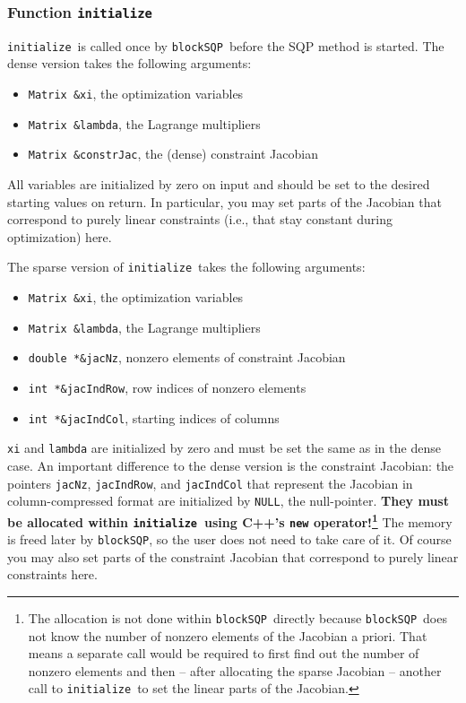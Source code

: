 \documentclass[	11pt,
				a4paper,
				abstract=true,
				twoside=true,
				bibliography=totoc, 
				headinclude=true,
				footinclude=false]{scrartcl}
\newcommand{\blockSQP}{\texttt{blockSQP}}
\newcommand{\init}{\texttt{initialize}}
\begin{document}
\subsubsection{Function \init}
\init\ is called once by \blockSQP\ before the SQP method is started. The dense version takes the following arguments:
\begin{itemize}
\item \texttt{Matrix \&xi}, the optimization variables
\item \texttt{Matrix \&lambda}, the Lagrange multipliers
\item \texttt{Matrix \&constrJac}, the (dense) constraint Jacobian
\end{itemize}
All variables are initialized by zero on input and should be set to the desired starting values on return. In particular, you may set parts of the Jacobian that correspond to purely linear constraints (i.e., that stay constant during optimization) here.

The sparse version of \init\ takes the following arguments:
\begin{itemize}
\item \texttt{Matrix \&xi}, the optimization variables
\item \texttt{Matrix \&lambda}, the Lagrange multipliers
\item \texttt{double *\&jacNz}, nonzero elements of constraint Jacobian
\item \texttt{int *\&jacIndRow}, row indices of nonzero elements
\item \texttt{int *\&jacIndCol}, starting indices of columns
\end{itemize}
\texttt{xi} and \texttt{lambda} are initialized by zero and must be set the same as in the dense case. An important difference to the dense version is the constraint Jacobian: the pointers \texttt{jacNz}, \texttt{jacIndRow}, and \texttt{jacIndCol} that represent the Jacobian in column-compressed format are initialized by \texttt{NULL}, the null-pointer. \textbf{They must be allocated within \init\ using C++'s \texttt{new} operator!\footnote{The allocation is not done within \blockSQP\ directly because \blockSQP\ does not know the number of nonzero elements of the Jacobian a priori. That means a separate call would be required to first find out the number of nonzero elements and then -- after allocating the sparse Jacobian -- another call to \init\ to set the linear parts of the Jacobian.}} The memory is freed later by \blockSQP, so the user does not need to take care of it. Of course you may also set parts of the constraint Jacobian that correspond to purely linear constraints here.
\end{document}
